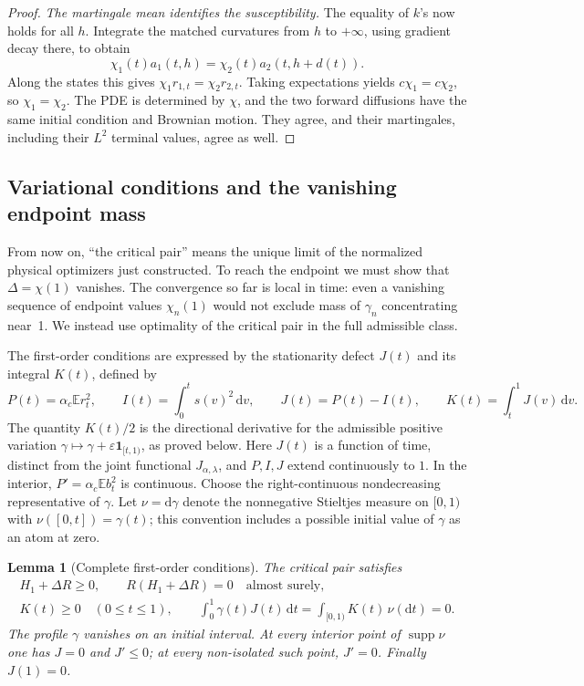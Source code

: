 \documentclass[11pt,a4paper]{article}
\numberwithin{equation}{section}
\newtheorem{lemma}[theorem]{Lemma}
\theoremstyle{definition}
\theoremstyle{remark}
\newcommand{\E}{\mathbb E}
\newcommand{\dd}{\mathrm d}
\newcommand{\ind}{\mathbf 1}
\newcommand{\eps}{\varepsilon}
\DeclareMathOperator{\supp}{supp}
\begin{document}
\begin{proof}
\emph{The martingale mean identifies the susceptibility.}
The equality of $k$'s now holds for all $h$. Integrate the matched
curvatures from $h$ to $+\infty$, using gradient decay there, to obtain
\[
 \chi_1(t)a_1(t,h)
          =\chi_2(t)a_2(t,h+d(t)).
\]
Along the states this gives $\chi_1r_{1,t}=\chi_2r_{2,t}$.
Taking expectations yields $c\chi_1=c\chi_2$, so $\chi_1=\chi_2$.
The PDE is determined by $\chi$, and the two forward diffusions have
the same initial condition and Brownian motion.  They agree, and their
martingales, including their $L^2$ terminal values, agree as well.
\end{proof}

\subsection{Variational conditions and the vanishing endpoint mass}

From now on, ``the critical pair'' means the unique limit of the
normalized physical optimizers just constructed. To reach the endpoint
we must show that $\Delta=\chi(1)$ vanishes. The convergence so far is
local in time: even a vanishing sequence of endpoint values
$\chi_n(1)$ would not exclude mass of $\gamma_n$ concentrating near~1.
We instead use optimality of the critical pair in the full admissible
class.

The first-order conditions are expressed by the stationarity defect
$J(t)$ and its integral $K(t)$, defined by
\[
 P(t)=\alpha_c\E r_t^2,\qquad
 I(t)=\int_0^t s(v)^2\,\dd v,\qquad
 J(t)=P(t)-I(t),\qquad K(t)=\int_t^1J(v)\,\dd v.
\]
The quantity $K(t)/2$ is the directional derivative for the admissible
positive variation $\gamma\mapsto\gamma+\eps\ind_{[t,1)}$, as proved below.
Here $J(t)$ is a function of time, distinct from the joint functional
$J_{\alpha,\lambda}$, and $P,I,J$ extend continuously to $1$.  In the interior,
$P'=\alpha_c\E b_t^2$ is continuous.  Choose the right-continuous
nondecreasing representative of $\gamma$.  Let $\nu=\dd\gamma$ denote the
nonnegative Stieltjes measure on $[0,1)$ with
$\nu([0,t])=\gamma(t)$; this convention includes a possible initial
value of $\gamma$ as an atom at zero.

\begin{lemma}[Complete first-order conditions]\label{crit:kkt}
The critical pair satisfies
\begin{gather}
 H_1+\Delta R\ge0,\qquad R(H_1+\Delta R)=0
                         \quad\text{almost surely},
                  \label{crit:complementarity}\\
 K(t)\ge0\quad(0\le t\le1),\qquad
 \int_0^1\gamma(t)J(t)\,\dd t=\int_{[0,1)}K(t)\,\nu(\dd t)=0.
                  \label{crit:kkt-profile}
\end{gather}
The profile $\gamma$ vanishes on an initial interval.  At every interior
point of $\supp\nu$ one has $J=0$ and $J'\le0$; at every non-isolated
such point, $J'=0$.  Finally $J(1)=0$.
\end{lemma}
\end{document}
